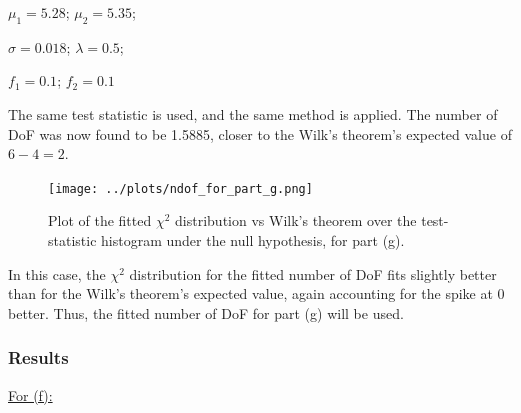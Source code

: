 \documentclass[12pt]{report} %
\begin{document}
\begin{center}
    $\mu_{1} = 5.28$;  
    $\mu_{2} = 5.35$;  

    $\sigma = 0.018$;
    $\lambda = 0.5$;  

    $f_{1} = 0.1$;
    $f_{2} = 0.1$
\end{center}

The same test statistic is used, and the same method is applied. The number of DoF was now found to be 1.5885, closer to the Wilk's theorem's expected value of $6 - 4 = 2$. 

\begin{figure}[t]
    \centering
    \texttt{[image: ../plots/ndof\_for\_part\_g.png]}
    \captionsetup{margin=1.3cm}
    \caption[width=0.2\pdfpagewidth]{Plot of the fitted $\chi^{2}$ distribution vs Wilk's theorem over the test-statistic histogram under the null hypothesis, for part (g).}
\end{figure}
\newpage
In this case, the $\chi^{2}$ distribution for the fitted number of DoF fits slightly better than for the Wilk's theorem's expected value, again accounting for the spike at 0 better. Thus, the fitted number of DoF for part (g) will be used.

\subsubsection*{Results}

\underline{For (f):}
\end{document}
